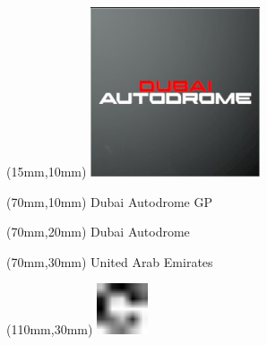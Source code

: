 \null\newpage
\begin{textblock*}{50mm}(15mm,10mm)%
\includegraphics[width=50mm]{LG/2015-05-20_00081.png}
\end{textblock*}
\begin{textblock*}{130mm}(70mm,10mm)%
{\fontsize{20}{20}\selectfont Dubai Autodrome GP}\\
\end{textblock*}
\begin{textblock*}{120mm}(70mm,20mm)%
{\fontsize{16}{16}\selectfont Dubai Autodrome}\\
\end{textblock*}
\begin{textblock*}{120mm}(70mm,30mm)%
{\fontsize{12}{12}\selectfont United Arab Emirates}
\end{textblock*}
\begin{textblock*}{30mm}(110mm,30mm)%
\centering
\includegraphics[height=15mm]{icons/fa-rotate-right.pdf}
\end{textblock*}
